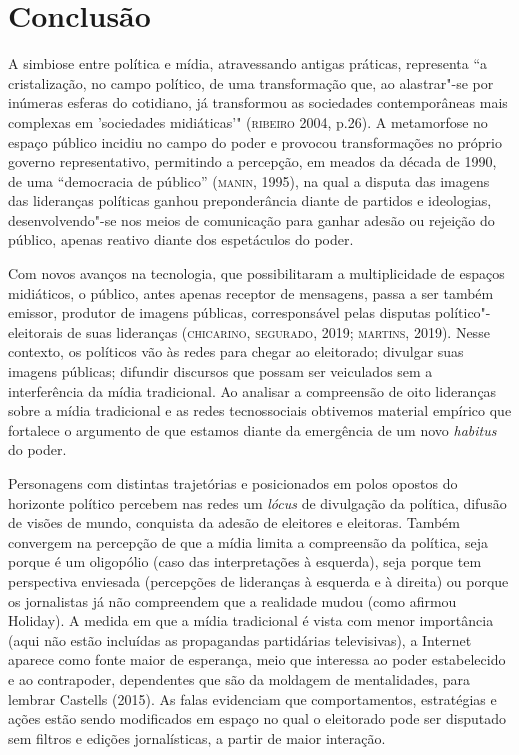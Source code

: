 \section{Conclusão}

A simbiose entre política e mídia, atravessando antigas práticas,
representa ``a cristalização, no campo político, de uma transformação
que, ao alastrar"-se por inúmeras esferas do cotidiano, já transformou as
sociedades contemporâneas mais complexas em 'sociedades midiáticas'"
(\textsc{ribeiro} 2004, p.26). A metamorfose no espaço público incidiu no campo
do poder e provocou transformações no próprio governo representativo,
permitindo a percepção, em meados da década de 1990, de uma ``democracia
de público'' (\textsc{manin}, 1995), na qual a disputa das imagens das lideranças
políticas ganhou preponderância diante de partidos e ideologias,
desenvolvendo"-se nos meios de comunicação para ganhar adesão ou rejeição
do público, apenas reativo diante dos espetáculos do poder.

Com novos avanços na tecnologia, que possibilitaram a multiplicidade de
espaços midiáticos, o público, antes apenas receptor de mensagens, passa
a ser também emissor, produtor de imagens públicas, corresponsável pelas
disputas político"-eleitorais de suas lideranças (\textsc{chicarino}, \textsc{segurado},
2019; \textsc{martins}, 2019). Nesse contexto, os políticos vão às redes para
chegar ao eleitorado; divulgar suas imagens públicas; difundir discursos
que possam ser veiculados sem a interferência da mídia tradicional. Ao
analisar a compreensão de oito lideranças sobre a mídia tradicional e as
redes tecnossociais obtivemos material empírico que fortalece o
argumento de que estamos diante da emergência de um novo \emph{habitus}
do poder.

Personagens com distintas trajetórias e posicionados em polos opostos do
horizonte político percebem nas redes um \emph{lócus} de divulgação da
política, difusão de visões de mundo, conquista da adesão de eleitores e
eleitoras. Também convergem na percepção de que a mídia limita a
compreensão da política, seja porque é um oligopólio (caso das
interpretações à esquerda), seja porque tem perspectiva enviesada
(percepções de lideranças à esquerda e à direita) ou porque os
jornalistas já não compreendem que a realidade mudou (como afirmou
Holiday). A medida em que a mídia tradicional é vista com menor
importância (aqui não estão incluídas as propagandas partidárias
televisivas), a Internet aparece como fonte maior de esperança, meio que
interessa ao poder estabelecido e ao contrapoder, dependentes que são da
moldagem de mentalidades, para lembrar Castells (2015). As falas
evidenciam que comportamentos, estratégias e ações estão sendo
modificados em espaço no qual o eleitorado pode ser disputado sem
filtros e edições jornalísticas, a partir de maior interação.

